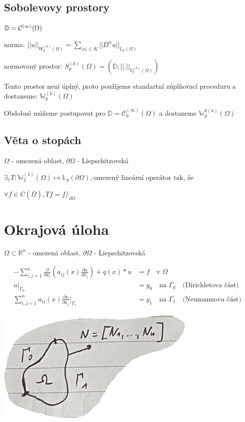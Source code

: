 \documentclass[../main.tex]{subfiles}
\begin{document}
\subsection{Sobolevovy prostory }

$\mathbb{D} = \mathcal{C}^{(\infty)}(\Omega)$

norma:
$||u||_{W_p^{(k)}(\Omega)} = \sum_{|\alpha| \leq K} ||D^\alpha u||_{\mathbb{L}_p(\Omega)}$

normovaný prostor: $S^{(k)}_p(\Omega) = (\mathbb{D}; ||.||_{V_p^{(k)}(\Omega)})$

Tento prostor není úplný, proto použijeme standartní zúplňovací proceduru a dostaneme:
$\mathbb{W}_p^{(k)}(\Omega)$

Obdobně můžeme postupovat pro $\mathbb{D} = \mathcal{C}^{(\infty)}_0(\Omega)$ a dostaneme $\mathbb{W}_p^{0 (k)}(\Omega)$

\subsection{Věta o stopách}

$\Omega$ - omezená oblast, $\partial \Omega$ - Liepschitzovská

$\exists_1 T: \mathbb{W}_2^{(1)}(\Omega) \mapsto \mathbb{L}_p (\partial \Omega), \text{omezený lineární operátor tak, že}$

$ \forall f\in C (\bar \Omega), Tf = f /_{\partial \Omega} $



\section{Okrajová úloha}\label{OkrajUloha}
$\Omega\subset\mathbb{R}^n$ - omezená oblast, $\partial \Omega$ - Liepschitzovská

\begin{align}\label{eq:okraj}
    - \sum_{i,j = 1}^{n} \frac{\partial}{\partial x_i} \left ( a_{ij}(x) \frac{\partial u}{\partial x_j}\right ) + q(x)*u &= f \quad \text{v } \Omega
    \\ \label{eq:PP1}
    u|_{\Gamma_0} &= g_0 \quad \text{na } \Gamma_0 \quad \text{(Dirichletova část)}
    \\ \label{eq:PP2}
    \sum_{i,j=1}^{n}a_{ij} (x) \frac{\partial u}{\partial x_j} |_{\Gamma_1} &= g_1 \quad \text{na } \Gamma_1 \quad \text{(Neumannova část)}
\end{align}

\includegraphics{images/oblast.PNG}
\end{document}
